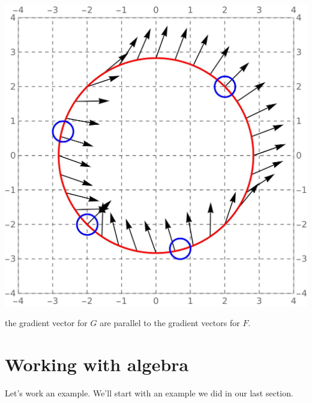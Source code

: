 \documentclass{ximera}
\begin{document}
\begin{example}
\begin{explanation}
\begin{feedback}[correct]
\begin{image}
        \includegraphics{curveVectors1Feedback.jpg}
      \end{image}
      the gradient vector for $G$ are parallel to the gradient vectors
      for $F$.
    \end{feedback}
  \end{explanation}
\end{example}


\section{Working with algebra}

Let's work an example. We'll start with an example we did in our last section.
\end{document}
